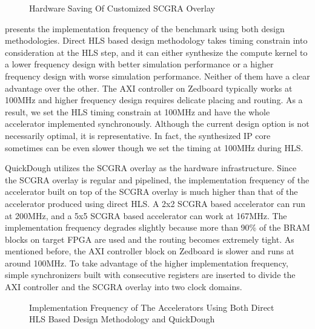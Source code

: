 \begin{figure}[htpb]
\caption{Hardware Saving Of Customized SCGRA Overlay}
\label{fig:hardware-saving}
\end{figure}

 presents the implementation frequency of the benchmark using both design methodologies. Direct HLS based design methodology takes timing constrain into consideration at the HLS step, and it can either synthesize the compute kernel to a lower frequency design with better simulation performance or a higher frequency design with worse simulation performance. Neither of them have a clear advantage over the other. The AXI controller on Zedboard typically works at 100MHz and higher frequency design requires delicate placing and routing. As a result, we set the HLS timing constrain at 100MHz and have the whole accelerator implemented synchronously. Although the current design option is not necessarily optimal, it is representative. In fact, the synthesized IP core sometimes can be even slower though we set the timing at 100MHz during HLS.

QuickDough utilizes the SCGRA overlay as the hardware infrastructure. Since the SCGRA overlay is regular and pipelined, the implementation frequency of the accelerator built on top of the SCGRA overlay is much higher than that of the accelerator produced using direct HLS. A 2x2 SCGRA based accelerator can run at 200MHz, and a 5x5 SCGRA based accelerator can work at 167MHz. The implementation frequency degrades slightly because more than 90\% of the BRAM blocks on target FPGA are used and the routing becomes extremely tight. As mentioned before, the AXI controller block on Zedboard is slower and runs at around 100MHz. To take advantage of the higher implementation frequency, simple synchronizers built with consecutive registers are inserted to divide the AXI controller and the SCGRA overlay into two clock domains.

\begin{figure*}[htpb]
\caption{Implementation Frequency of The Accelerators Using Both Direct HLS Based Design Methodology and QuickDough}
\label{fig:impl-freq}
\end{figure*}

